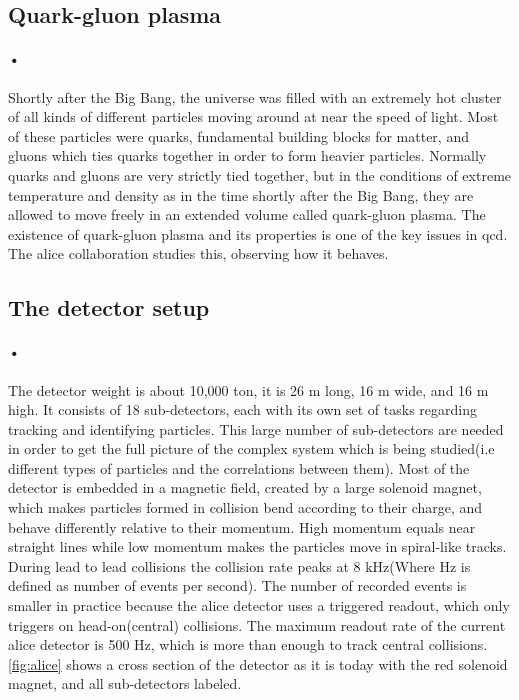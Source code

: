 \documentclass[a4paper, 12pt]{report}
\begin{document}
\subsection{Quark-gluon plasma}
\paragraph{•}
Shortly after the Big Bang, the universe was filled with an extremely hot cluster of all kinds of different particles moving around at near the speed of light\cite{alice-physics}.
Most of these particles were quarks, fundamental building blocks for matter, and gluons which ties quarks together in order to form heavier particles.
Normally quarks and gluons are very strictly tied together, but in the conditions of extreme temperature and density as in the time shortly after the Big Bang, they are allowed to move freely in an extended volume called quark-gluon plasma.
The existence of quark-gluon plasma and its properties is one of the key issues in \gls{qcd}.
The \gls{alice} collaboration studies this, observing how it behaves.

\subsection{The detector setup}
\paragraph{•}
The detector weight is about 10,000 ton, it is 26 m long, 16 m wide, and 16 m high\cite{alice-about}.
It consists of 18 sub-detectors, each with its own set of tasks regarding tracking and identifying particles.
This large number of sub-detectors are needed in order to get the full picture of the complex system which is being studied(i.e different types of particles and the correlations between them).
Most of the detector is embedded in a magnetic field, created by a large solenoid magnet, which makes particles formed in collision bend according to their charge, and behave differently relative to their momentum. High momentum equals near straight lines while low momentum makes the particles move in spiral-like tracks.
During lead to lead collisions the collision rate peaks at 8 kHz(Where Hz is defined as number of events per second).
The number of recorded events is smaller in practice because the \gls{alice} detector uses a triggered readout, which only triggers on head-on(central) collisions.
The maximum readout rate of the current \gls{alice} detector is 500 Hz, which is more than enough to track central collisions.
\ref{fig:alice} shows a cross section of the detector as it is today with the red solenoid magnet, and all sub-detectors labeled.
\end{document}
